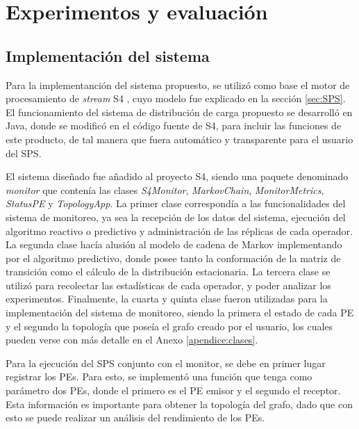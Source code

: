 \chapter{Experimentos y evaluación}
\label{cap:experimentos}

\section{Implementación del sistema}

Para la implementanción del sistema propuesto, se utilizó como base el motor de procesamiento de \textit{stream} S4 \citep{s4}, cuyo modelo fue explicado en la sección \ref{sec:SPS}. El funcionamiento del sistema de distribución de carga propuesto se desarrolló en Java, donde se modificó en el código fuente de S4, para incluir las funciones de este producto, de tal manera que fuera automático y transparente para el usuario del SPS.

El sistema diseñado fue añadido al proyecto S4, siendo una paquete denominado \textit{monitor} que contenía las clases \textit{S4Monitor}, \textit{MarkovChain}, \textit{MonitorMetrics}, \textit{StatusPE} y \textit{TopologyApp}. La primer clase correspondía a las funcionalidades del sistema de monitoreo, ya sea la recepción de los datos del sistema, ejecución del algoritmo reactivo o predictivo y administración de las réplicas de cada operador. La segunda clase hacía alusión al modelo de cadena de Markov implementando por el algoritmo predictivo, donde posee tanto la conformación de la matriz de transición como el cálculo de la distribución estacionaria. La tercera clase se utilizó para recolectar las estadísticas de cada operador, y poder analizar los experimentos. Finalmente, la cuarta y quinta clase fueron utilizadas para la implementación del sistema de monitoreo, siendo la primera el estado de cada PE y el segundo la topología que poseía el grafo creado por el usuario, los cuales pueden verse con más detalle en el Anexo \ref{apendice:clases}.

Para la ejecución del SPS conjunto con el monitor, se debe en primer lugar registrar los PEs. Para esto, se implementó una función que tenga como parámetro dos PEs, donde el primero es el PE emisor y el segundo el receptor. Esta información es importante para obtener la topología del grafo, dado que con esto se puede realizar un análisis del rendimiento de los PEs.

